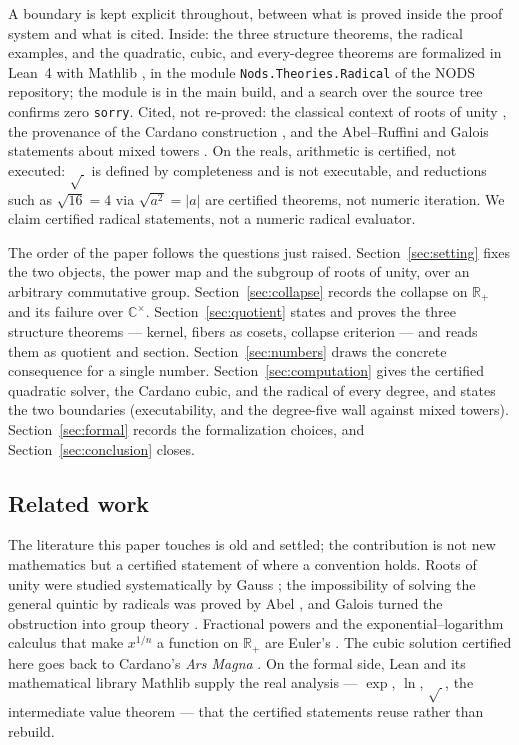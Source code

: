 \documentclass[submission,noinfoline]{jsfds}
\newcommand{\abs}[1]{\lvert #1\rvert}
\begin{document}
A boundary is kept explicit throughout, between what is proved inside
the proof system and what is cited. Inside: the three structure
theorems, the radical examples, and the quadratic, cubic, and
every-degree theorems are formalized in Lean~4 \citep{deMoura2015} with
Mathlib \citep{MathlibCommunity2020}, in the module
\texttt{Nods.Theories.\allowbreak Radical} of the NODS repository; the module is in
the main build, and a search over the source tree confirms zero
\texttt{sorry}. Cited, not re-proved: the classical context of roots of
unity \citep{Gauss1801}, the provenance of the Cardano construction
\citep{Cardano1545}, and the Abel--Ruffini and Galois statements about
mixed towers \citep{Abel1824,Galois1846}. On the reals, arithmetic is
certified, not executed: $\sqrt{\,}$ is defined by completeness and is
not executable, and reductions such as $\sqrt{16}=4$ via
$\sqrt{a^2}=\abs a$ are certified theorems, not numeric iteration. We
claim certified radical statements, not a numeric radical evaluator.

The order of the paper follows the questions just raised.
Section~\ref{sec:setting} fixes the two objects, the power map and the
subgroup of roots of unity, over an arbitrary commutative group.
Section~\ref{sec:collapse} records the collapse on $\mathbb R_+$ and
its failure over $\mathbb C^\times$. Section~\ref{sec:quotient} states
and proves the three structure theorems --- kernel, fibers as cosets,
collapse criterion --- and reads them as quotient and section.
Section~\ref{sec:numbers} draws the concrete consequence for a single
number. Section~\ref{sec:computation} gives the certified quadratic
solver, the Cardano cubic, and the radical of every degree, and states
the two boundaries (executability, and the degree-five wall against
mixed towers). Section~\ref{sec:formal} records the formalization
choices, and Section~\ref{sec:conclusion} closes.

\subsection{Related work}

The literature this paper touches is old and settled; the contribution
is not new mathematics but a certified statement of where a convention
holds. Roots of unity were studied systematically by Gauss
\citep{Gauss1801}; the impossibility of solving the general quintic by
radicals was proved by Abel \citep{Abel1824}, and Galois turned the
obstruction into group theory \citep{Galois1846}. Fractional powers and
the exponential--logarithm calculus that make $x^{1/n}$ a function on
$\mathbb R_+$ are Euler's \citep{Euler1748}. The cubic solution
certified here goes back to Cardano's \emph{Ars Magna}
\citep{Cardano1545}. On the formal side, Lean \citep{deMoura2015} and
its mathematical library Mathlib \citep{MathlibCommunity2020} supply the
real analysis --- $\exp$, $\ln$, $\sqrt{\,}$, the intermediate value
theorem --- that the certified statements reuse rather than rebuild.
\end{document}
